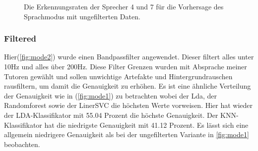 \begin{figure}[H]
\centering     %
{}
\caption{Die Erkennungsraten der Sprecher 4 und 7 für die Vorhersage des Sprachmodus mit ungefilterten Daten.}
\end{figure}
\clearpage

\subsubsection{Filtered}
Hier(\ref{fig:mode2}) wurde einen Bandpassfilter angewendet. Dieser filtert alles unter 10Hz und alles über 200Hz. Diese Filter Grenzen wurden mit Absprache meiner Tutoren gewählt und sollen unwichtige Artefakte und Hintergrundrauschen rausfiltern, um damit die Genauigkeit zu erhöhen. Es ist eine ähnliche Verteilung der Genauigkeit wie in (\ref{fig:mode1}) zu betrachten wobei der Lda, der Randomforest sowie der LinerSVC die höchsten Werte vorweisen. Hier hat wieder der LDA-Klassifikator mit 55.04 Prozent die höchste Genauigkeit. Der KNN-Klassifikator hat die niedrigste Genauigkeit mit 41.12 Prozent. Es lässt sich eine allgemein niedrigere Genauigkeit als bei der ungefilterten Variante in \ref{fig:mode1} beobachten.

